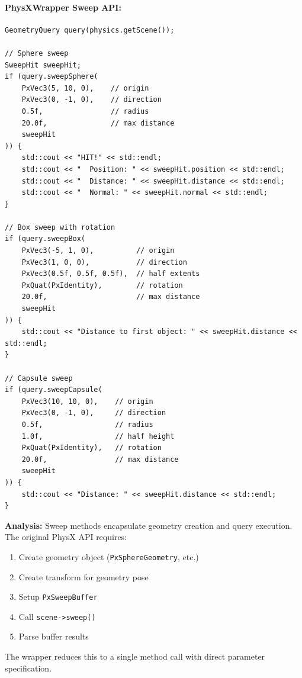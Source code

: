 \paragraph{PhysXWrapper Sweep API:}

\begin{lstlisting}[style=cpp, caption=Wrapper Sweep Queries]
GeometryQuery query(physics.getScene());

// Sphere sweep
SweepHit sweepHit;
if (query.sweepSphere(
    PxVec3(5, 10, 0),    // origin
    PxVec3(0, -1, 0),    // direction
    0.5f,                // radius
    20.0f,               // max distance
    sweepHit
)) {
    std::cout << "HIT!" << std::endl;
    std::cout << "  Position: " << sweepHit.position << std::endl;
    std::cout << "  Distance: " << sweepHit.distance << std::endl;
    std::cout << "  Normal: " << sweepHit.normal << std::endl;
}

// Box sweep with rotation
if (query.sweepBox(
    PxVec3(-5, 1, 0),          // origin
    PxVec3(1, 0, 0),           // direction
    PxVec3(0.5f, 0.5f, 0.5f),  // half extents
    PxQuat(PxIdentity),        // rotation
    20.0f,                     // max distance
    sweepHit
)) {
    std::cout << "Distance to first object: " << sweepHit.distance << std::endl;
}

// Capsule sweep
if (query.sweepCapsule(
    PxVec3(10, 10, 0),    // origin
    PxVec3(0, -1, 0),     // direction
    0.5f,                 // radius
    1.0f,                 // half height
    PxQuat(PxIdentity),   // rotation
    20.0f,                // max distance
    sweepHit
)) {
    std::cout << "Distance: " << sweepHit.distance << std::endl;
}
\end{lstlisting}

\textbf{Analysis:} Sweep methods encapsulate geometry creation and query execution. The original PhysX API requires:
\begin{enumerate}
    \item Create geometry object (\texttt{PxSphereGeometry}, etc.)
    \item Create transform for geometry pose
    \item Setup \texttt{PxSweepBuffer}
    \item Call \texttt{scene->sweep()}
    \item Parse buffer results
\end{enumerate}

The wrapper reduces this to a single method call with direct parameter specification.

